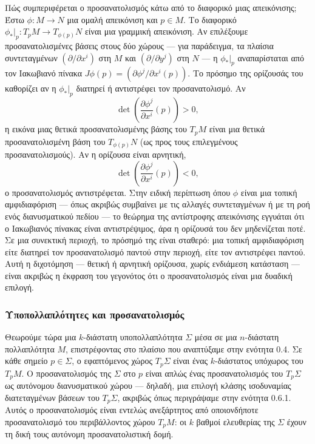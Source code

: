 \documentclass[11pt,a4paper,twoside,openright]{book}
\begin{document}
Πώς συμπεριφέρεται ο προσανατολισμός κάτω από το διαφορικό μιας απεικόνισης; Έστω $\phi: M \to N$ μια ομαλή απεικόνιση και $p \in M$. Το διαφορικό $\phi_*|_p: T_pM \to T_{\phi(p)}N$ είναι μια γραμμική απεικόνιση. Αν επιλέξουμε προσανατολισμένες βάσεις στους δύο χώρους --- για παράδειγμα, τα πλαίσια συντεταγμένων $(\partial / \partial x^i)$ στη $M$ και $(\partial / \partial y^j)$ στη $N$ --- η $\phi_*|_p$ αναπαρίσταται από τον Ιακωβιανό πίνακα $J\phi(p) = (\partial \phi^j / \partial x^i(p))$. Το πρόσημο της ορίζουσάς του καθορίζει αν η $\phi_*|_p$ διατηρεί ή αντιστρέφει τον προσανατολισμό. Αν
\[
\det \left( \frac{\partial \phi^j}{\partial x^i}(p) \right) > 0,
\]
η εικόνα μιας θετικά προσανατολισμένης βάσης του $T_pM$ είναι μια θετικά προσανατολισμένη βάση του $T_{\phi(p)}N$ (ως προς τους επιλεγμένους προσανατολισμούς). Αν η ορίζουσα είναι αρνητική,
\[
\det \left( \frac{\partial \phi^j}{\partial x^i}(p) \right) < 0,
\]
ο προσανατολισμός αντιστρέφεται. Στην ειδική περίπτωση όπου $\phi$ είναι μια τοπική αμφιδιαφόριση --- όπως ακριβώς συμβαίνει με τις αλλαγές συντεταγμένων ή με τη ροή ενός διανυσματικού πεδίου --- το θεώρημα της αντίστροφης απεικόνισης εγγυάται ότι ο Ιακωβιανός πίνακας είναι αντιστρέψιμος, άρα η ορίζουσά του δεν μηδενίζεται ποτέ. Σε μια συνεκτική περιοχή, το πρόσημό της είναι σταθερό: μια τοπική αμφιδιαφόριση είτε διατηρεί τον προσανατολισμό παντού στην περιοχή, είτε τον αντιστρέφει παντού. Αυτή η διχοτόμηση --- θετική ή αρνητική ορίζουσα, χωρίς ενδιάμεση κατάσταση --- είναι ακριβώς η έκφραση του γεγονότος ότι ο προσανατολισμός είναι μια δυαδική επιλογή.

\subsubsection{Υποπολλαπλότητες και προσανατολισμός}

Θεωρούμε τώρα μια $k$-διάστατη υποπολλαπλότητα $\Sigma$ μέσα σε μια $n$-διάστατη πολλαπλότητα $M$, επιστρέφοντας στο πλαίσιο που αναπτύξαμε στην ενότητα 0.4. Σε κάθε σημείο $p \in \Sigma$, ο εφαπτόμενος χώρος $T_p\Sigma$ είναι ένας $k$-διάστατος υπόχωρος του $T_pM$. Ο προσανατολισμός της $\Sigma$ στο $p$ είναι απλώς ένας προσανατολισμός του $T_p\Sigma$ ως αυτόνομου διανυσματικού χώρου --- δηλαδή, μια επιλογή κλάσης ισοδυναμίας διατεταγμένων βάσεων του $T_p\Sigma$, ακριβώς όπως περιγράψαμε στην ενότητα 0.6.1. Αυτός ο προσανατολισμός είναι εντελώς ανεξάρτητος από οποιονδήποτε προσανατολισμό του περιβάλλοντος χώρου $T_pM$: οι $k$ βαθμοί ελευθερίας της $\Sigma$ έχουν τη δική τους αυτόνομη προσανατολιστική δομή.
\end{document}
